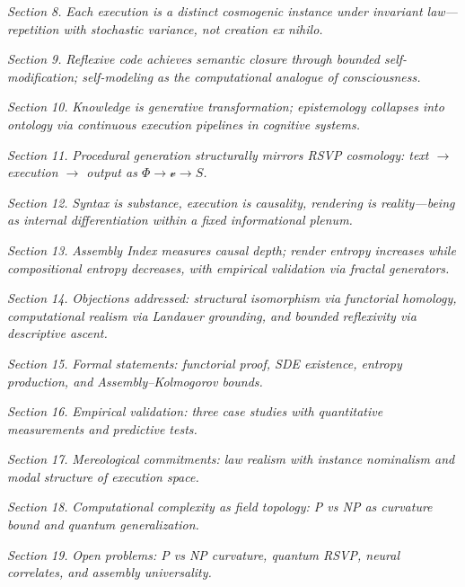 \documentclass[12pt,a4paper]{article}
\theoremstyle{plain}
\theoremstyle{definition}
\theoremstyle{remark}
\newcommand{\Phifield}{\Phi}
\newcommand{\vfield}{\mathcal{v}}
\newcommand{\Sfield}{S}
\begin{document}
\textit{Section 8.} \textit{Each execution is a distinct cosmogenic instance under invariant law—repetition with stochastic variance, not creation ex nihilo.}

\textit{Section 9.} \textit{Reflexive code achieves semantic closure through bounded self-modification; self-modeling as the computational analogue of consciousness.}

\textit{Section 10.} \textit{Knowledge is generative transformation; epistemology collapses into ontology via continuous execution pipelines in cognitive systems.}

\textit{Section 11.} \textit{Procedural generation structurally mirrors RSVP cosmology: text $\to$ execution $\to$ output as $\Phifield \to \vfield \to \Sfield$.}

\textit{Section 12.} \textit{Syntax is substance, execution is causality, rendering is reality—being as internal differentiation within a fixed informational plenum.}

\textit{Section 13.} \textit{Assembly Index measures causal depth; render entropy increases while compositional entropy decreases, with empirical validation via fractal generators.}

\textit{Section 14.} \textit{Objections addressed: structural isomorphism via functorial homology, computational realism via Landauer grounding, and bounded reflexivity via descriptive ascent.}

\textit{Section 15.} \textit{Formal statements: functorial proof, SDE existence, entropy production, and Assembly–Kolmogorov bounds.}

\textit{Section 16.} \textit{Empirical validation: three case studies with quantitative measurements and predictive tests.}

\textit{Section 17.} \textit{Mereological commitments: law realism with instance nominalism and modal structure of execution space.}

\textit{Section 18.} \textit{Computational complexity as field topology: P vs NP as curvature bound and quantum generalization.}

\textit{Section 19.} \textit{Open problems: P vs NP curvature, quantum RSVP, neural correlates, and assembly universality.}
\end{document}
